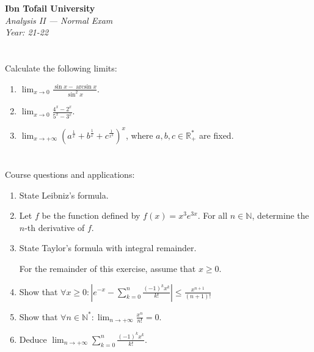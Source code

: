 \documentclass[12pt]{article}
\begin{document}
\begin{center}
  \Large\textbf{Ibn Tofail University} \\[1em]
  \large\textit{Analysis II — Normal Exam} \\[0.5em]
  \large\textit{Year: 21-22} \\[2em]
\end{center}

\vspace{0.5cm}

\section{}
Calculate the following limits:
\begin{enumerate}
    \item $\displaystyle \lim_{x \to 0} \frac{\sin x - \arcsin x}{\sin^2 x}$.
    
    \item $\displaystyle \lim_{x \to 0} \frac{4^x - 2^x}{5^x - 3^x}$.
    
    \item $\displaystyle \lim_{x \to +\infty} \left(a^\frac{1}{x} + b^\frac{1}{x} + 
    c^\frac{1}{x^3}\right)^x$, where $a, b, c \in \mathbb{R}^*_+$ are fixed.
\end{enumerate}

\newpage

\begin{answerbox}


\end{answerbox}

\newpage

\section{}
Course questions and applications:
\begin{enumerate}
    \item State Leibniz's formula.
    
    \item Let $f$ be the function defined by $f(x) = x^3 e^{3x}$. For all $n \in \mathbb{N}$, determine the $n$-th derivative of $f$.
    
    \item State Taylor's formula with integral remainder.
    
    For the remainder of this exercise, assume that $x \geq 0$.
    
    \item Show that
    $\forall x \geq 0 : \left| e^{-x} - \sum_{k=0}^{n}\frac{(-1)^k x^k}{k!} \right| \leq \frac{x^{n+1}}{(n+1)!}$
    
    \item Show that $\forall n \in \mathbb{N}^* : \lim_{n \to +\infty} \frac{x^n}{n!} = 0$.
    
    \item Deduce $\lim_{n \to +\infty} \sum_{k=0}^{n}\frac{(-1)^k x^k}{k!}$.
\end{enumerate}
\end{document}

